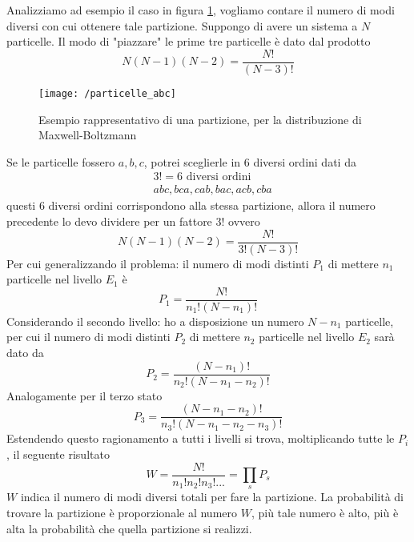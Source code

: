 Analizziamo ad esempio il caso in figura \ref{esempio_partizione}, vogliamo contare il numero di modi diversi con cui ottenere tale partizione.
Suppongo di avere un sistema a $N$ particelle.
Il modo di "piazzare" le prime tre particelle è dato dal prodotto
\begin{equation}
N (N-1) (N-2) = \frac{N!}{(N-3)!}
\end{equation}
\begin{figure}[h]
\centering
\texttt{[image: /particelle\_abc]}
\caption{Esempio rappresentativo di una partizione, per la distribuzione di Maxwell-Boltzmann}
\label{esempio_partizione}
\end{figure}
Se le particelle fossero $a,b,c$, potrei sceglierle in 6 diversi ordini dati da
\begin{equation}
\begin{split}
& 3! = 6 \mbox{ diversi ordini} \\
& abc, bca, cab, bac, acb, cba
\end{split}
\end{equation}
questi 6 diversi ordini corrispondono alla stessa partizione, allora il numero precedente lo devo dividere per un fattore $3!$ ovvero
\begin{equation}
N (N-1) (N-2) = \frac{N!}{3!(N-3)!}
\end{equation}
Per cui generalizzando il problema: il numero di modi distinti $P_1$ di mettere $n_1$ particelle nel livello $E_1$ è
\begin{equation}
P_1 = \frac{ N!}{n_1! (N-n_1)! }
\label{stat_class}
\end{equation}
Considerando il secondo livello: ho a disposizione un numero $N-n_1$ particelle, per cui il numero di modi distinti $P_2$ di mettere $n_2$ particelle nel livello $E_2$ sarà dato da
\begin{equation}
P_2 = \frac{ (N-n_1)!}{n_2! (N-n_1-n_2)! }
\end{equation}
Analogamente per il terzo stato
\begin{equation}
P_3 = \frac{(N-n_1 - n_2)!}{n_3! ( N - n_1 - n_2 - n_3)!}
\end{equation}
Estendendo questo ragionamento a tutti i livelli si trova, moltiplicando tutte le $P_i$, il seguente risultato
\begin{equation}
W =  \frac{N!}{n_1! n_2! n_3! ... } = \prod_s P_s
\end{equation}
$W$ indica il numero di modi diversi totali per fare la partizione.
La probabilità di trovare la partizione è proporzionale al numero $W$, più tale numero è alto, più è alta la probabilità che quella partizione si realizzi.

